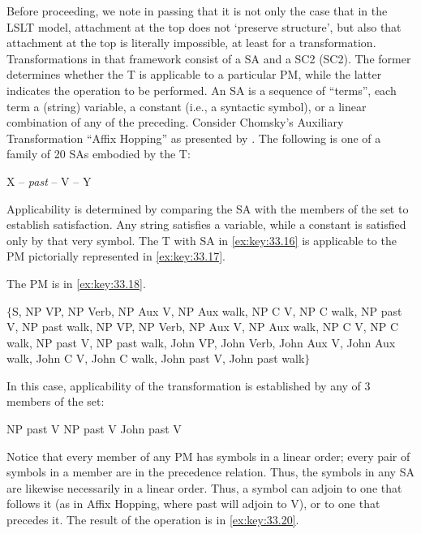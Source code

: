 \documentclass[output=paper]{langsci/langscibook}
\begin{document}
Before proceeding, we note in passing that it is not only the case that in the
LSLT\nocite{Chomsky1955} model, attachment at the top does not `preserve
structure', but also that attachment at the top is literally impossible, at
least for a transformation.  Transformations in that framework consist of a
\gls{SA} and a \gls{SC2} (\glsdesc{SC2}). The former determines whether the T
is applicable to a particular \gls{PM}, while the latter
indicates the operation to be performed.  An \gls{SA} is a sequence of
``terms'', each term a (string) variable, a constant (i.e., a syntactic
symbol), or a linear combination of any of the preceding.  Consider Chomsky's
Auxiliary Transformation ``Affix Hopping'' as presented by
\textcite{Chomsky1957}. The following is one of a family of 20 \glspl{SA}
embodied by the T:

\ea\label{ex:key:33.16}X -- \emph{past} -- V -- Y
\z

Applicability is determined by comparing the \gls{SA} with the members of the
set to establish satisfaction. Any string satisfies a variable, while a
constant is satisfied only by that very symbol. The T with \gls{SA} in
\eqref{ex:key:33.16} is applicable to the \gls{PM} pictorially represented in
\eqref{ex:key:33.17}.

\ea\label{ex:key:33.17}
\z

The \gls{PM} is in \eqref{ex:key:33.18}.

\ea\label{ex:key:33.18}$\{$S, NP VP, NP Verb, NP Aux V, NP Aux walk, NP C V, NP C walk, NP past V, NP past walk, NP VP, NP Verb, NP Aux V, NP Aux walk, NP C V, NP C walk, NP past V, NP past walk, John VP, John Verb, John Aux V, John Aux walk, John C V, John C walk, John past V, John past walk$\}$
\z

In this case, applicability of the transformation is established by any of 3
members of the set:

\ea\label{ex:key:33.19}NP past V\hspace{5mm} NP past V\hspace{5mm} John past V
\z

Notice that every member of any \gls{PM} has symbols in a linear order; every
pair of symbols in a member are in the precedence relation. Thus, the symbols
in any \gls{SA} are likewise necessarily in a linear order. Thus, a symbol can
adjoin to one that follows it (as in Affix Hopping, where past will adjoin to
V), or to one that precedes it. The result of the operation is in
\eqref{ex:key:33.20}.
\end{document}
